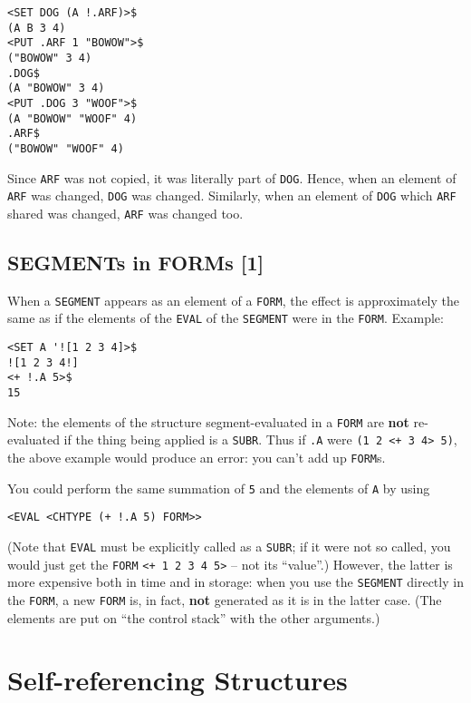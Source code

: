 \documentclass[a4paper]{scrbook}
\begin{document}
\begin{verbatim}
<SET DOG (A !.ARF)>$
(A B 3 4)
<PUT .ARF 1 "BOWOW">$
("BOWOW" 3 4)
.DOG$
(A "BOWOW" 3 4)
<PUT .DOG 3 "WOOF">$
(A "BOWOW" "WOOF" 4)
.ARF$
("BOWOW" "WOOF" 4)
\end{verbatim}

 Since \texttt{ARF} was not copied, it was literally part of \texttt{DOG}. Hence, when an element of
\texttt{ARF} was changed, \texttt{DOG} was changed. Similarly, when an element of \texttt{DOG} which \texttt{ARF} shared
was changed, \texttt{ARF} was changed too.

\subsection{SEGMENTs in FORMs {[}1{]}}\label{segments-in-forms-1}

When a \texttt{SEGMENT} appears as an element of a \texttt{FORM}, the effect is approximately the same as if the elements
of the \texttt{EVAL} of the \texttt{SEGMENT} were in the \texttt{FORM}. Example:

\begin{verbatim}
<SET A '![1 2 3 4]>$
![1 2 3 4!]
<+ !.A 5>$
15
\end{verbatim}

Note: the elements of the structure segment-evaluated in a \texttt{FORM} are \textbf{not} re-evaluated if the thing being
applied is a \texttt{SUBR}. Thus if \texttt{.A} were \texttt{(1\ 2\ \textless{}+\ 3\ 4\textgreater{}\ 5)}, the above
example would produce an error: you can't add up \texttt{FORM}s.

You could perform the same summation of \texttt{5} and the elements of \texttt{A} by using

\begin{verbatim}
<EVAL <CHTYPE (+ !.A 5) FORM>>
\end{verbatim}

(Note that \texttt{EVAL} must be explicitly called as a \texttt{SUBR}; if it were not so called, you would just get the
\texttt{FORM} \texttt{\textless{}+\ 1\ 2\ 3\ 4\ 5\textgreater{}} -- not its ``value''.) However, the latter is more
expensive both in time and in storage: when you use the \texttt{SEGMENT} directly in the \texttt{FORM}, a new \texttt{FORM}
is, in fact, \textbf{not} generated as it is in the latter case. (The elements are put on ``the control stack'' with the
other arguments.)

\section{Self-referencing Structures}\label{self-referencing-structures}
\end{document}
